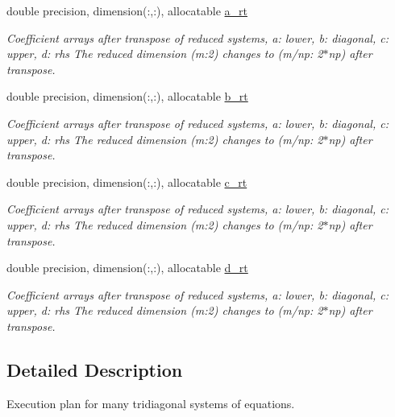 \textbf{ }\par
\begin{DoxyCompactItemize}
\item 
double precision, dimension(\+:,\+:), allocatable \mbox{\hyperlink{structpascal__tdma_1_1ptdma__plan__many_a42be039aee75c5393c22111cf232e77d}{a\+\_\+rt}}
\begin{DoxyCompactList}\small\item\em Coefficient arrays after transpose of reduced systems, a\+: lower, b\+: diagonal, c\+: upper, d\+: rhs The reduced dimension (m\+:2) changes to (m/np\+: 2$\ast$np) after transpose. \end{DoxyCompactList}\item 
double precision, dimension(\+:,\+:), allocatable \mbox{\hyperlink{structpascal__tdma_1_1ptdma__plan__many_aab84eff7c823d47acb5388cd4e2a790a}{b\+\_\+rt}}
\begin{DoxyCompactList}\small\item\em Coefficient arrays after transpose of reduced systems, a\+: lower, b\+: diagonal, c\+: upper, d\+: rhs The reduced dimension (m\+:2) changes to (m/np\+: 2$\ast$np) after transpose. \end{DoxyCompactList}\item 
double precision, dimension(\+:,\+:), allocatable \mbox{\hyperlink{structpascal__tdma_1_1ptdma__plan__many_a49336d53d19c274798e87ae33b530b33}{c\+\_\+rt}}
\begin{DoxyCompactList}\small\item\em Coefficient arrays after transpose of reduced systems, a\+: lower, b\+: diagonal, c\+: upper, d\+: rhs The reduced dimension (m\+:2) changes to (m/np\+: 2$\ast$np) after transpose. \end{DoxyCompactList}\item 
double precision, dimension(\+:,\+:), allocatable \mbox{\hyperlink{structpascal__tdma_1_1ptdma__plan__many_af0941ce4b9206c36a3a059d2bae84d2b}{d\+\_\+rt}}
\begin{DoxyCompactList}\small\item\em Coefficient arrays after transpose of reduced systems, a\+: lower, b\+: diagonal, c\+: upper, d\+: rhs The reduced dimension (m\+:2) changes to (m/np\+: 2$\ast$np) after transpose. \end{DoxyCompactList}\end{DoxyCompactItemize}



\subsection{Detailed Description}
Execution plan for many tridiagonal systems of equations. 

